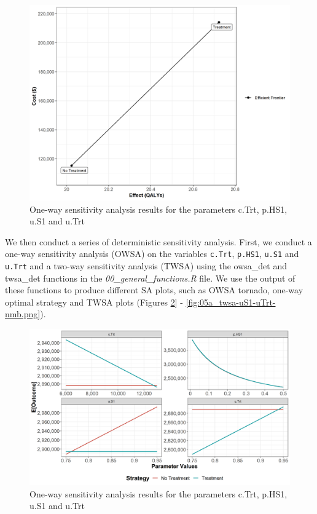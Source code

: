 \documentclass[]{article}
\begin{document}
\begin{figure}
\centering
\includegraphics{../figs/05a_cea-frontier.png}
\caption{One-way sensitivity analysis results for the parameters c.Trt,
p.HS1, u.S1 and u.Trt \label{fig:05a_CEA-frontier}}
\end{figure}

We then conduct a series of deterministic sensitivity analysis. First,
we conduct a one-way sensitivity analysis (OWSA) on the variables
\texttt{c.Trt}, \texttt{p.HS1}, \texttt{u.S1} and \texttt{u.Trt} and a
two-way sensitivity analysis (TWSA) using the owsa\_det and twsa\_det
functions in the \emph{00\_general\_functions.R} file. We use the output
of these functions to produce different SA plots, such as OWSA tornado,
one-way optimal strategy and TWSA plots (Figures
\ref{fig:05a_owsa-nmb}{]} - \ref{fig:05a_twsa-uS1-uTrt-nmb.png}).

\begin{figure}
\centering
\includegraphics{../figs/05a_owsa-nmb.png}
\caption{One-way sensitivity analysis results for the parameters c.Trt,
p.HS1, u.S1 and u.Trt \label{fig:05a_owsa-nmb}}
\end{figure}
\end{document}
